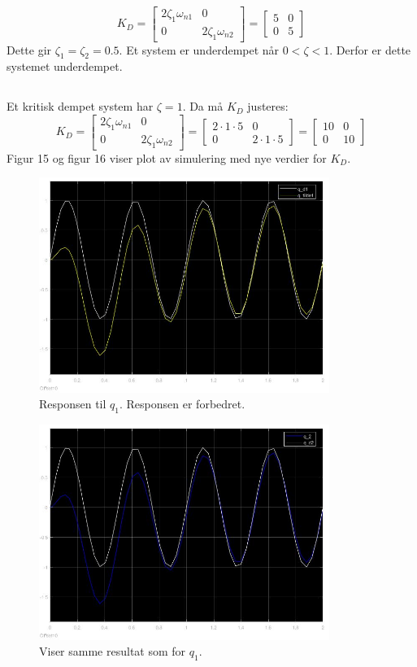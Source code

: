 \documentclass[norsk]{article}
\begin{document}
\[K_D = \begin{bmatrix}
2\zeta_1\omega_{n1} & 0 \\ 0 & 2\zeta_1\omega_{n2}
\end{bmatrix} 
= 
\begin{bmatrix}
5 & 0 \\ 0 & 5 
\end{bmatrix}
\]
Dette gir \(\zeta_1 = \zeta_2 = 0.5\). Et system er underdempet når \(0 < \zeta < 1\). Derfor er dette systemet underdempet. 
\subsection{ }
Et kritisk dempet system har \(\zeta = 1\). Da må \(K_D\) justeres:
\[K_D = \begin{bmatrix}
2\zeta_1\omega_{n1} & 0 \\ 0 & 2\zeta_1\omega_{n2}
\end{bmatrix} 
= 
\begin{bmatrix}
2 \cdot 1 \cdot 5 & 0 \\ 0 & 2 \cdot 1 \cdot 5 
\end{bmatrix}
= 
\begin{bmatrix}
10 & 0 \\ 0 & 10 
\end{bmatrix}
\]
Figur 15 og figur 16 viser plot av simulering med nye verdier for \(K_D\).

\begin{figure}[H]
\includegraphics[height=7cm]{illustrations/oppg3g_illu1}
\caption{Responsen til \(q_1\). Responsen er forbedret.}
\end{figure}

\begin{figure}[H]
\includegraphics[height=7cm]{illustrations/oppg3g_illu2}
\caption{Viser samme resultat som for \(q_1\).}
\end{figure}
\end{document}
